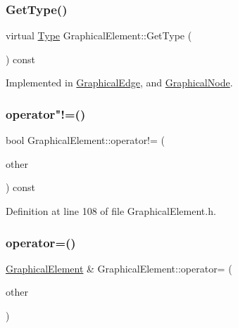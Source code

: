 \subsubsection{\texorpdfstring{Get\+Type()}{GetType()}}
{\footnotesize\ttfamily virtual \hyperlink{class_graphical_element_aa485be48b901d85de97b3bd86f381d9e}{Type} Graphical\+Element\+::\+Get\+Type (\begin{DoxyParamCaption}{ }\end{DoxyParamCaption}) const\hspace{0.3cm}{\ttfamily [pure virtual]}}



Implemented in \hyperlink{class_graphical_edge_ad2db5ea6f28e2e572583909ff1f68088}{Graphical\+Edge}, and \hyperlink{class_graphical_node_a6bfbcb9a6b85dd3093a8f6541252ebfe}{Graphical\+Node}.

\mbox{\label{class_graphical_element_a23d2d7494818f017ca0f0ea4f36f54b5}} 
\subsubsection{\texorpdfstring{operator"!=()}{operator!=()}}
{\footnotesize\ttfamily bool Graphical\+Element\+::operator!= (\begin{DoxyParamCaption}\item[{const \hyperlink{class_graphical_element}{Graphical\+Element} \&}]{other }\end{DoxyParamCaption}) const\hspace{0.3cm}{\ttfamily [inline]}}



Definition at line 108 of file Graphical\+Element.\+h.

\mbox{\label{class_graphical_element_add7f7f8fe319b3d966ffe3e756ef7b2e}} 
\subsubsection{\texorpdfstring{operator=()}{operator=()}}
{\footnotesize\ttfamily \hyperlink{class_graphical_element}{Graphical\+Element} \& Graphical\+Element\+::operator= (\begin{DoxyParamCaption}\item[{const \hyperlink{class_graphical_element}{Graphical\+Element} \&}]{other }\end{DoxyParamCaption})}



